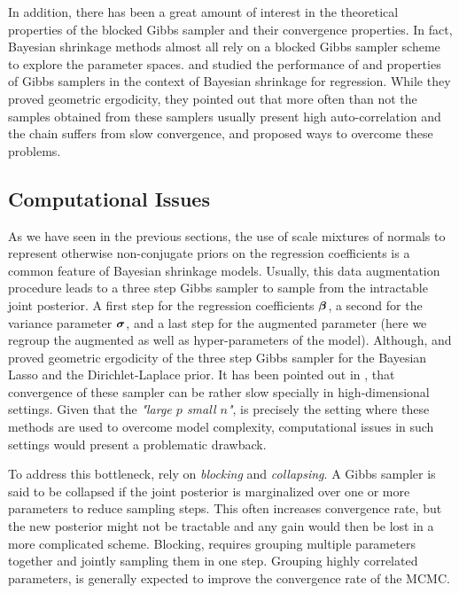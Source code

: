 \documentclass[10pt]{article}
\begin{document}
In addition, there has been a great amount of interest in the theoretical properties of the blocked Gibbs sampler and their convergence properties. In fact, Bayesian shrinkage methods almost all rely on a blocked Gibbs sampler scheme to explore the parameter spaces. \cite{Rajaratnam2017Gibbs} and \cite{Khare2014ergodicity} studied the performance of and properties of Gibbs samplers in the context   of Bayesian shrinkage for regression. While they proved geometric ergodicity, they  pointed out that more often than not the samples obtained from these samplers usually present high auto-correlation and the chain suffers from slow convergence, and proposed   ways to overcome these problems.

\subsection{Computational Issues}

As we have seen in the previous sections, the use of scale mixtures of normals to represent otherwise non-conjugate priors on the regression coefficients is a common feature of Bayesian shrinkage models. Usually, this data augmentation procedure leads to a three step Gibbs sampler to sample from the intractable joint posterior. A first step for the regression coefficients $\boldsymbol{\beta}$, a second for the variance parameter $\boldsymbol{\sigma}$, and a last step for the augmented parameter (here we regroup the augmented as well as hyper-parameters of the model). Although, \cite{Khare2013blasso_ergodicity} and \cite{Khare2014ergodicity} proved geometric ergodicity of the three step Gibbs sampler for the Bayesian Lasso and the Dirichlet-Laplace prior. It has been pointed out in \cite{Rajaratnam2017Gibbs}, that convergence of these sampler can be rather slow specially in high-dimensional settings. Given that the \textit{"large $p$ small $n$"}, is precisely the setting where these methods are used to overcome model complexity, computational issues in such settings would present a problematic drawback. 

To address this bottleneck, \cite{Rajaratnam2017Gibbs} rely on \textit{blocking} and \textit{collapsing}. A Gibbs sampler is said to be collapsed if the joint posterior is marginalized over one or more parameters to reduce sampling steps. This often increases convergence rate, but the new posterior might not be tractable and any gain would then be lost in a more complicated scheme. Blocking, requires grouping multiple parameters together and jointly sampling them in one step. Grouping highly correlated parameters, is generally expected to improve the convergence rate of the MCMC.
\end{document}
